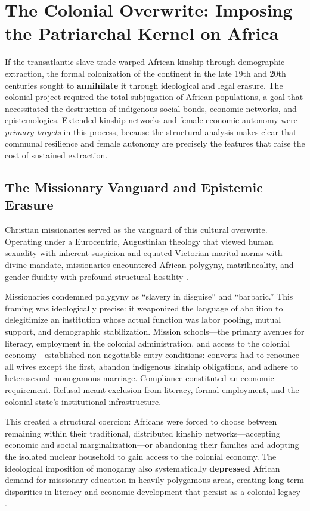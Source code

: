 \section{The Colonial Overwrite: Imposing the Patriarchal Kernel on Africa}
\label{sec:overwrite}

If the transatlantic slave trade warped African kinship through demographic extraction, the formal colonization of the continent in the late 19th and 20th centuries sought to \textbf{annihilate} it through ideological and legal erasure. The colonial project required the total subjugation of African populations, a goal that necessitated the destruction of indigenous social bonds, economic networks, and epistemologies. Extended kinship networks and female economic autonomy were \textit{primary targets} in this process, because the structural analysis makes clear that communal resilience and female autonomy are precisely the features that raise the cost of sustained extraction.

\subsection{The Missionary Vanguard and Epistemic Erasure}
\label{sec:missionary}

Christian missionaries served as the vanguard of this cultural overwrite. Operating under a Eurocentric, Augustinian theology that viewed human sexuality with inherent suspicion and equated Victorian marital norms with divine mandate, missionaries encountered African polygyny, matrilineality, and gender fluidity with profound structural hostility \cite{colonial_polygamy_pmc, missionary_attitudes, colonial_gender_subsaharan}.

Missionaries condemned polygyny as ``slavery in disguise'' and ``barbaric.'' This framing was ideologically precise: it weaponized the language of abolition to delegitimize an institution whose actual function was labor pooling, mutual support, and demographic stabilization. Mission schools---the primary avenues for literacy, employment in the colonial administration, and access to the colonial economy---established non-negotiable entry conditions: converts had to renounce all wives except the first, abandon indigenous kinship obligations, and adhere to heterosexual monogamous marriage. Compliance constituted an economic requirement. Refusal meant exclusion from literacy, formal employment, and the colonial state's institutional infrastructure.

This created a structural coercion: Africans were forced to choose between remaining within their traditional, distributed kinship networks---accepting economic and social marginalization---or abandoning their families and adopting the isolated nuclear household to gain access to the colonial economy. The ideological imposition of monogamy also systematically \textbf{depressed} African demand for missionary education in heavily polygamous areas, creating long-term disparities in literacy and economic development that persist as a colonial legacy \cite{colonial_polygamy_pmc}.

